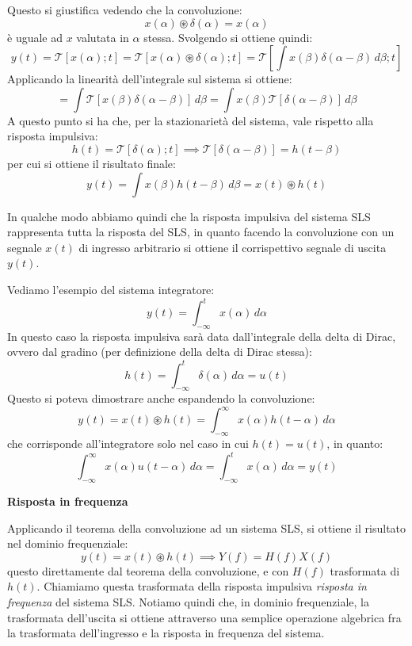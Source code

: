 \documentclass[a4paper,11pt]{article}
\begin{document}
Questo si giustifica vedendo che la convoluzione:
$$
x(\alpha) \circledast \delta(\alpha) = x(\alpha)
$$
è uguale ad $x$ valutata in $\alpha$ stessa. Svolgendo si ottiene quindi:
$$
y(t) = \mathcal{T} \left[ x(\alpha) ; t \right] = \mathcal{T} \left[ x(\alpha) \circledast \delta(\alpha) ; t \right] =
\mathcal{T} \left[ \int x(\beta) \delta(\alpha - \beta) \, d\beta ; t \right]
$$
Applicando la linearità dell'integrale sul sistema si ottiene:
$$
= \int \mathcal{T} \left[ x(\beta) \delta(\alpha - \beta) \right] \, d\beta = 
\int x(\beta) \mathcal{T} \left[ \delta(\alpha - \beta) \right] \, d\beta
$$
A questo punto si ha che, per la stazionarietà del sistema, vale rispetto alla risposta impulsiva:
$$
h(t) = \mathcal{T} \left[ \delta(\alpha); t \right] \implies
\mathcal{T} \left[ \delta(\alpha - \beta) \right] = h(t - \beta)
$$
per cui si ottiene il risultato finale:
$$
y(t) = \int x(\beta) h(t - \beta) \, d\beta = x(t) \circledast h(t)
$$

In qualche modo abbiamo quindi che la risposta impulsiva del sistema SLS rappresenta tutta la risposta del SLS, in quanto facendo la convoluzione con un segnale $x(t)$ di ingresso arbitrario si ottiene il corrispettivo segnale di uscita $y(t)$.

\par\smallskip

Vediamo l'esempio del sistema integratore:
$$
y(t) = \int_{-\infty}^t x(\alpha) \, d\alpha
$$
In questo caso la risposta impulsiva sarà data dall'integrale della delta di Dirac, ovvero dal gradino (per definizione della delta di Dirac stessa):
$$
h(t) = \int_{-\infty}^t \delta(\alpha) \, d\alpha = u(t)
$$
Questo si poteva dimostrare anche espandendo la convoluzione:
$$
y(t) = x(t) \circledast h(t) = \int_{-\infty}^{\infty} x(\alpha) h(t - \alpha) \, d\alpha
$$
che corrisponde all'integratore solo nel caso in cui $h(t) = u(t)$, in quanto:
$$
\int_{-\infty}^{\infty} x(\alpha) u(t - \alpha) \, d\alpha = \int_{-\infty}^t x(\alpha) \, d\alpha = y(t)
$$

\par\smallskip

\noindent
\textbf{\textsf{Risposta in frequenza}}

\noindent
Applicando il teorema della convoluzione ad un sistema SLS, si ottiene il risultato nel dominio frequenziale:
$$
y(t) = x(t) \circledast h(t) \implies Y(f) = H(f) X(f)
$$
questo direttamente dal teorema della convoluzione, e con $H(f)$ trasformata di $h(t)$. Chiamiamo questa trasformata della risposta impulsiva \textit{risposta in frequenza} del sistema SLS. Notiamo quindi che, in dominio frequenziale, la trasformata dell'uscita si ottiene attraverso una semplice operazione algebrica fra la trasformata dell'ingresso e la risposta in frequenza del sistema.
\end{document}
